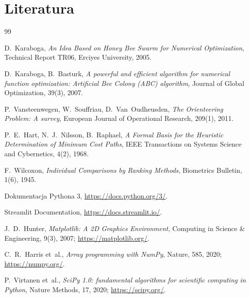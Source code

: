 \section{Literatura}
\label{sec:literatura}

\begin{thebibliography}{99}

D.~Karaboga,
\emph{An Idea Based on Honey Bee Swarm for Numerical Optimization},
Technical Report TR06, Erciyes University, 2005.

D.~Karaboga, B.~Basturk,
\emph{A powerful and efficient algorithm for numerical function
optimization: Artificial Bee Colony (ABC) algorithm},
Journal of Global Optimization, 39(3), 2007.

P.~Vansteenwegen, W.~Souffriau, D.~Van~Oudheusden,
\emph{The Orienteering Problem: A survey},
European Journal of Operational Research, 209(1), 2011.

P.~E.~Hart, N.~J.~Nilsson, B.~Raphael,
\emph{A Formal Basis for the Heuristic Determination of Minimum Cost Paths},
IEEE Transactions on Systems Science and Cybernetics, 4(2), 1968.

F.~Wilcoxon,
\emph{Individual Comparisons by Ranking Methods},
Biometrics Bulletin, 1(6), 1945.

Dokumentacja Pythona 3, \url{https://docs.python.org/3/}.

Streamlit Documentation, \url{https://docs.streamlit.io/}.

J.~D.~Hunter,
\emph{Matplotlib: A 2D Graphics Environment},
Computing in Science \& Engineering, 9(3), 2007;
\url{https://matplotlib.org/}.

C.~R.~Harris et~al.,
\emph{Array programming with NumPy},
Nature, 585, 2020;
\url{https://numpy.org/}.

P.~Virtanen et~al.,
\emph{SciPy 1.0: fundamental algorithms for scientific computing in Python},
Nature Methods, 17, 2020;
\url{https://scipy.org/}.

\end{thebibliography}
